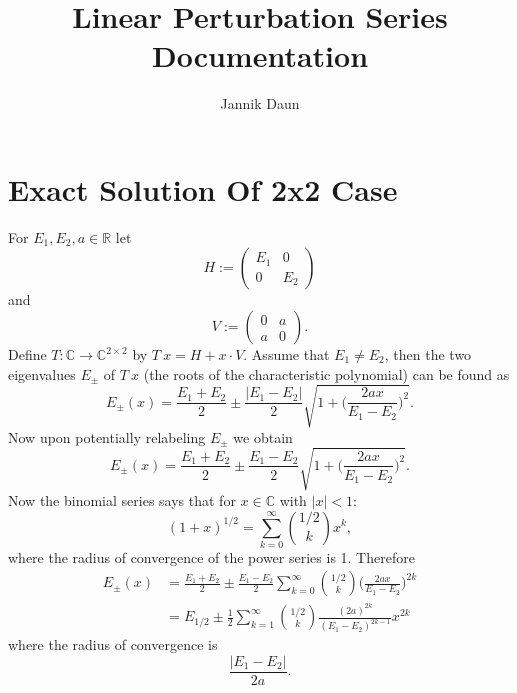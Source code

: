 \documentclass[11pt]{article}
\title{Linear Perturbation Series Documentation}
\author{Jannik Daun}
\begin{document}
\maketitle
\tableofcontents

\section{Exact Solution Of 2x2 Case}

For $E_1, E_2, a \in \mathbb{R}$
let
$$H:=
\begin{pmatrix}
E_1 & 0 \\
0 & E_2
\end{pmatrix}$$
and
$$
V :=
\begin{pmatrix}
0 & a \\
a & 0
\end{pmatrix}.
$$
Define $T: \mathbb{C} \to \mathbb{C}^{2 \times 2}$
by $T \ x =  H + x \cdot V$.
Assume that $E_1 \neq E_2$, then
the two eigenvalues $E_\pm$ of $T \  x$ (the roots of the characteristic polynomial) can be found as
\begin{equation}
   E_\pm (x) =  \frac{E_{1}+ E_2}{2}
   \pm \frac{|E_1 -E_2|}{2} \sqrt{
    1 + \bigg(\frac{2 a x}{E_1-E_2}\bigg)^2
   }.
\end{equation}
Now upon potentially relabeling $E_\pm$ we obtain
\begin{equation}
    E_\pm (x) =  \frac{E_{1}+ E_2}{2}
    \pm \frac{E_1 -E_2}{2} \sqrt{
     1 + \bigg(\frac{2 a x}{E_1-E_2}\bigg)^2
    }.
 \end{equation}
Now the binomial series says that for $x \in \mathbb{C}$ with $|x|<1$:
\begin{equation}
    (1+x)^{1/2} = \sum_{k=0}^\infty
    {1/2 \choose k} x^k,
\end{equation}
where the radius of convergence of the power series is 1.
Therefore
\begin{equation}
    \begin{split}
        E_\pm (x) &=  \frac{E_{1}+ E_2}{2}
   \pm \frac{E_1 -E_2}{2} \sum_{k=0}^\infty
   {1/2 \choose k} \bigg(\frac{2 a x}{E_1-E_2}\bigg)^{2k} \\
   &= E_{1/2} \pm \frac{1}{2} \sum_{k=1}^\infty
   {1/2 \choose k} \frac{(2 a)^{2k}}{(E_1-E_2)^{2k-1}} x^{2k}
    \end{split}
\end{equation}
where the radius of convergence is
\begin{equation}
    \frac{|E_1 -E_2|}{2a} .
\end{equation}
\end{document}

